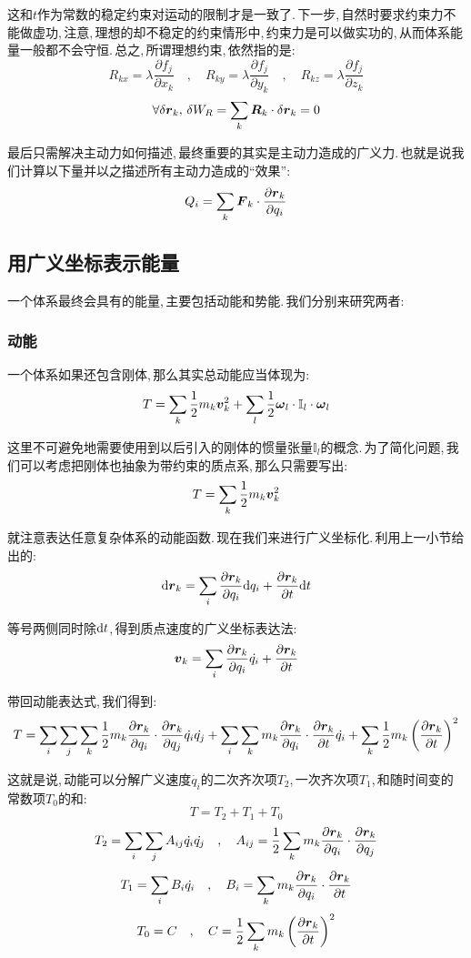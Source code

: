 这和$t$作为常数的稳定约束对运动的限制才是一致了.\,下一步,\,自然时要求约束力不能做虚功,\,注意,\,理想的却不稳定的约束情形中,\,约束力是可以做实功的,\,从而体系能量一般都不会守恒.\,总之,\,所谓理想约束,\,依然指的是:
\[R_{kx}=\lambda \frac{\partial f_j}{\partial x_k}\quad,\quad R_{ky}=\lambda \frac{\partial f_j}{\partial y_k}\quad,\quad R_{kz}=\lambda \frac{\partial f_j}{\partial z_k}\]
\[\forall\delta \boldsymbol{r}_k,\, \delta W_R=\sum_k \boldsymbol{R}_k\cdot \delta \boldsymbol{r}_k=0\]

最后只需解决主动力如何描述,\,最终重要的其实是主动力造成的广义力.\,也就是说我们计算以下量并以之描述所有主动力造成的``效果'':
\[Q_i=\sum_k \boldsymbol{F}_k\cdot \frac{\partial \boldsymbol{r}_k}{\partial q_i}\]


\subsection{用广义坐标表示能量}

一个体系最终会具有的能量,\,主要包括动能和势能.\,我们分别来研究两者:

\subsubsection{动能}
一个体系如果还包含刚体,\,那么其实总动能应当体现为:
\[T=\sum_k \frac{1}{2}m_k \boldsymbol{v}_k^2+\sum_l\frac{1}{2}\boldsymbol{\omega}_l\cdot \mathbb{I}_l\cdot \boldsymbol{\omega}_l\]

这里不可避免地需要使用到以后引入的刚体的惯量张量$\mathbb{I}_l$的概念.\,为了简化问题,\,我们可以考虑把刚体也抽象为带约束的质点系,\,那么只需要写出:
\[T=\sum_k \frac{1}{2}m_k \boldsymbol{v}_k^2\]

就注意表达任意复杂体系的动能函数.\,现在我们来进行广义坐标化.\,利用上一小节给出的:
\[\textrm{d} \boldsymbol{r}_k=\sum_i \frac{\partial \boldsymbol{r}_k}{\partial q_i}\textrm{d} q_i+\frac{\partial \boldsymbol{r}_k}{\partial t}\textrm{d} t\]

等号两侧同时除$\textrm{d} t$,\,得到质点速度的广义坐标表达法:
\[\boldsymbol{v}_k=\sum_i \frac{\partial \boldsymbol{r}_k}{\partial q_i}\dot{q_i} +\frac{\partial \boldsymbol{r}_k}{\partial t}\]

带回动能表达式,\,我们得到:
\[T=\sum_i\sum_j\sum_k\frac{1}{2}m_k\frac{\partial \boldsymbol{r}_k}{\partial q_i}\cdot\frac{\partial \boldsymbol{r}_k}{\partial q_j}\dot{q_i}\dot{q_j}+\sum_i\sum_k m_k\frac{\partial \boldsymbol{r}_k}{\partial q_i}\cdot\frac{\partial \boldsymbol{r}_k}{\partial t}\dot{q_i}+\sum_k \frac{1}{2}m_k\left(\frac{\partial \boldsymbol{r}_k}{\partial t}\right)^2\]

这就是说,\,动能可以分解广义速度$\dot{q_i}$的二次齐次项$T_2$,\,一次齐次项$T_1$,\,和随时间变的常数项$T_0$的和:
\[T=T_2+T_1+T_0\]
\[T_2=\sum_i\sum_j A_{ij}\dot{q_i}\dot{q_j}\quad,\quad A_{ij}=\frac{1}{2}\sum_k m_k\frac{\partial \boldsymbol{r}_k}{\partial q_i}\cdot\frac{\partial \boldsymbol{r}_k}{\partial q_j}\]
\[T_1=\sum_i B_i \dot{q_i}\quad,\quad B_i=\sum_k m_k\frac{\partial \boldsymbol{r}_k}{\partial q_i}\cdot\frac{\partial \boldsymbol{r}_k}{\partial t}\]
\[T_0=C\quad,\quad C=\frac{1}{2}\sum_k m_k\left(\frac{\partial \boldsymbol{r}_k}{\partial t}\right)^2\]

